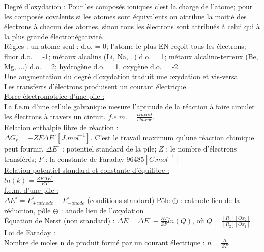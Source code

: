 \documentclass[../main.tex]{subfiles}
\begin{document}
Degré d'oxydation : Pour les composés ioniques c'est la charge de l'atome; pour les composés covalents si les atomes sont équivalents on attribue la moitié des électrons à chacun des atomes, sinon tous les électrons sont attribués à celui qui à la plus grande électronégativité.\\
Règles : un atome seul : d.o. = 0; l'atome le plus EN reçoit tous les électrons; fluor d.o. = -1; métaux alcalins (Li, Na,$\dots$) d.o. = 1; métaux alcalino-terreux (Be, Mg, $\dots$) d.o. = 2; hydrogène d.o. = 1, oxygène d.o. = -2. \\
Une augmentation du degré d'oxydation traduit une oxydation et vis-versa.\\
Les transferts d'électrons produisent un courant électrique. \\

\quad \underline{Force électromotrice d'une pile :}\\
La f.e.m d'une cellule galvanique mesure l'aptitude de la réaction à faire circuler les électrons à travers un circuit. $f.e.m. = \frac{travail}{charge}$.\\

\quad \underline{Relation enthalpie libre de réaction :}\\
$\Delta G_r^{\circ} = -ZF\Delta E^{\circ}[J.mol^{-1}]$. C'est le travail maximum qu'une réaction chimique peut fournir. $\Delta E^{\circ}$ : potentiel standard de la pile; $Z$ : le nombre d'électrons transférés; $F$ : la constante de Faraday 96485$[C.mol^{-1}]$\\

\quad \underline{Relation potentiel standard et constante d'équilibre :}\\
$ln(k) = \frac{ZF\Delta E^{\circ}}{RT}$\\

\quad \underline{f.e.m. d'une pile :}\\
$\Delta E^{\circ} = E_{+cathode}^{\circ} - E_{-anode}^{\circ}$ (conditions standard)
Pôle $\oplus$ : cathode lieu de la réduction, pôle $\ominus$ : anode lieu de l'oxydation\\
Équation de Nerst (non standard) : $\Delta E = \Delta E^{\circ} - \frac{RT}{ZF} ln(Q)$, où $Q = \frac{[R_1][Ox_2]}{[R_2][Ox_1]}$\\

\quad \underline{Loi de Faraday :}\\
Nombre de moles n de produit formé par un courant électrique : $n = \frac{It}{ZF}$\\
\end{document}
